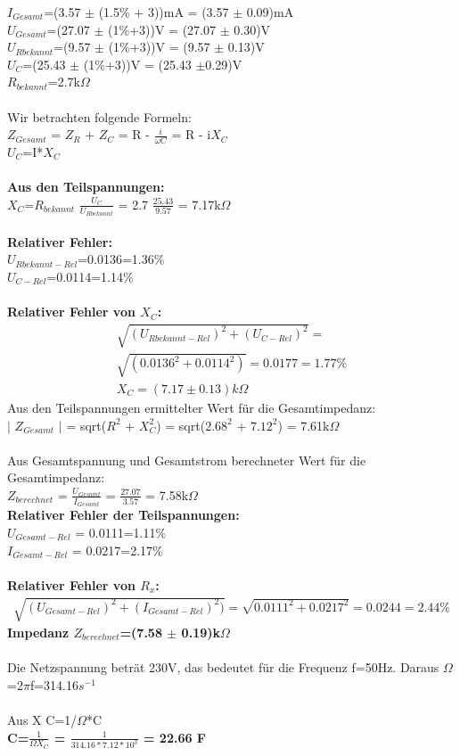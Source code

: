 \documentclass{article}
\begin{document}
$I_{Gesamt}$=(3.57 $\pm$ (1.5\% + 3))mA = (3.57 $\pm$ 0.09)mA\\
$U_{Gesamt}$=(27.07 $\pm$ (1\%+3))V = (27.07 $\pm$ 0.30)V\\
$U_{Rbekannt}$=(9.57 $\pm$ (1\%+3))V = (9.57 $\pm$ 0.13)V\\
$U_C$=(25.43 $\pm$ (1\%+3))V = (25.43 $\pm$0.29)V\\
$R_{bekannt}$=2.7k$\Omega$\\
\\
Wir betrachten folgende Formeln:\\
$Z_{Gesamt}$ = $Z_R$ + $Z_C$ = R - $\frac{i}{\omega C}$ = R - i$X_C$\\
$U_C$=I*$X_C$\\
\\
\textbf{Aus den Teilspannungen:}\\
$X_C$=$R_{bekannt}$ $\frac{U_C}{U_{Rbekannt}}$ = 2.7 $\frac{25.43}{9.57}$ = 7.17k$\Omega$\\
\\
\textbf{Relativer Fehler:}\\
$U_{Rbekannt-Rel}$=0.0136=1.36\%\\
$U_{C-Rel}$=0.0114=1.14\%\\
\\
\textbf{Relativer Fehler von $X_C$:}\\
\begin{gather}
\sqrt{(U_{Rbekannt-Rel})^2+(U_{C-Rel})^2}=\\
\sqrt{(0.0136^2+0.0114^2)}=0.0177=1.77\% \\
X_C=(7.17 \pm 0.13)k\Omega
\end{gather} 
Aus den Teilspannungen ermittelter Wert für die Gesamtimpedanz:\\
$\lvert$ $Z_{Gesamt}$ $\rvert$ = sqrt($R^2$ + $X_C^2$) = sqrt($2.68^2$ + $7.12^2$) = 7.61k$\Omega$\\
\\
Aus Gesamtspannung und Gesamtstrom berechneter Wert für die Gesamtimpedanz:\\
$Z_{berechnet}$ = $\frac{U_{Gesamt}}{I_{Gesamt}}$ = $\frac{27.07}{3.57}$ = 7.58k$\Omega$\\

\textbf{Relativer Fehler der Teilspannungen:}\\
$U_{Gesamt-Rel}$ = 0.0111=1.11\%\\
$I_{Gesamt-Rel}$ = 0.0217=2.17\%\\
\\
\textbf{Relativer Fehler von $R_x$:}\\
\begin{gather}	
\sqrt{(U_{Gesamt-Rel})^2+(I_{Gesamt-Rel})^2)}=\sqrt{0.0111^2+0.0217^2}=0.0244=2.44\%
\end{gather}
\textbf{Impedanz $Z_{berechnet}$=(7.58 $\pm$ 0.19)k$\Omega$}\\
\\
Die Netzspannung beträt 230V, das bedeutet für die Frequenz f=50Hz. Daraus $\Omega$=2$\pi$f=314.16$s^{-1}$\\
\\
Aus X C=1/$\Omega$*C\\
\textbf{C=$\frac{1}{\Omega X_C}$ = $\frac{1}{314.16*7.12*10^3}$ = 22.66 F}
\end{document}
